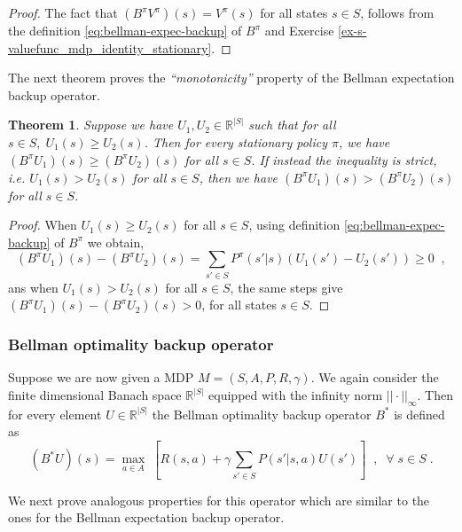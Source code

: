 \documentclass{article}
\newtheorem{theorem}{Theorem}[section]
\theoremstyle{definition}
\theoremstyle{remark}
\begin{document}
\begin{proof}
The fact that $(B^{\pi}V^{\pi})(s) = V^{\pi}(s)$ for all states $s \in S$, follows from the definition \eqref{eq:bellman-expec-backup} of $B^{\pi}$ and Exercise \ref{ex-s-valuefunc_mdp_identity_stationary}.
\end{proof}

The next theorem proves the \textit{``monotonicity''} property of the Bellman expectation backup operator.

\begin{theorem}
Suppose we have $U_1, U_2 \in \mathbb{R}^{|S|}$ such that for all $s \in S,\; U_1(s) \geq U_2(s)$. Then for every stationary policy $\pi$, we have $(B^{\pi}U_1)(s) \geq (B^{\pi}U_2)(s)$ for all $s \in S$. If instead the inequality is strict, i.e. $U_1(s) > U_2(s)$ for all $s \in S$, then we have $(B^{\pi}U_1)(s) > (B^{\pi}U_2)(s)$ for all $s \in S$.
\label{th-bellman-expec-backup-monoton}
\end{theorem}

\begin{proof}
When $U_1(s) \geq U_2(s)$ for all $s \in S$, using definition \eqref{eq:bellman-expec-backup} of $B^{\pi}$ we obtain,
\begin{equation}
(B^{\pi}U_1)(s) - (B^{\pi}U_2)(s) = \sum_{s' \in S} P^{\pi}(s'|s) (U_1(s') - U_2(s')) \geq 0 \;\;,
\label{eq:bellman-expec-backup-monoton-proof-eq1}
\end{equation}
ans when $U_1(s) > U_2(s)$ for all $s \in S$, the same steps give $(B^{\pi}U_1)(s) - (B^{\pi}U_2)(s) > 0$, for all states $s \in S$.
\end{proof}

\subsubsection{Bellman optimality backup operator}
Suppose we are now given a MDP $M=(S,A,P,R,\gamma)$. We again consider the finite dimensional Banach space $\mathbb{R}^{|S|}$ equipped with the infinity norm $||\cdot||_{\infty}$. Then for every element $U \in \mathbb{R}^{|S|}$ the Bellman optimality backup operator $B^{\ast}$ is defined as
\begin{equation}
(B^{\ast}U)(s) = \underset{a \in A}{\max} \; \left[ R(s,a) + \gamma \sum_{s' \in S} P(s'|s,a)U(s') \right] \;\;, \;\; \forall \; s \in S \;.
\label{eq:bellman-opt-backup}
\end{equation}

We next prove analogous properties for this operator which are similar to the ones for the Bellman expectation backup operator.
\end{document}
